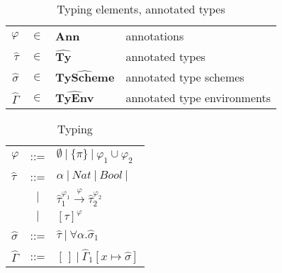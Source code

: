\documentclass[a4paper]{article}
\begin{document}
\begin{table}
    \begin{centering}
    \begin{tabular}{rcll}
        $\varphi$ &               $\in$ & \textbf{Ann}                   & annotations \\ 
        $\widehat{\tau}$&         $\in$ & $\widehat{\textbf{Ty}      } $ & annotated types \\
        $\widehat{\sigma} $&      $\in$ & $\widehat{\textbf{TyScheme}} $ & annotated type schemes\\
        $\widehat{\Gamma}$&       $\in$ & $\widehat{\textbf{TyEnv}   } $ & annotated type environments  \\
    \end{tabular}
    \caption{Typing elements, annotated types}
    \label{tab:typingelems}
    \end{centering}
\end{table}
\begin{table}
    \begin{centering}
    \begin{tabular}{lcl}
        $ \varphi$         & ::= & $ \emptyset \:|\: \{\pi\} \:|\: \varphi_1 \cup \varphi_2 $ \\
        $\widehat{\tau}$   & ::= & $\alpha \:|\: Nat \: | \: Bool \: | \: $ \\
        & $|$ & $\widehat{\tau}_1^{\varphi_1}
                           \stackrel{\varphi}{\rightarrow} 
                           \widehat{\tau}_2^{\varphi_2} $ \\
                           & $|$ & $ %
                           [\widehat{\tau}]^\varphi   $ \\ 
        $\widehat{\sigma}$ & ::= & $\widehat{\tau} \:|\: \forall \alpha. \widehat{\sigma}_1 $ \\ 
        $\widehat{\Gamma}$ & ::= & $[\,] \:|\: \widehat{\Gamma}_1[x \mapsto \widehat{\sigma}] $ \\
    \end{tabular}
    \caption{Typing}
    \label{tab:typing}
    \end{centering}
\end{table}
\end{document}
